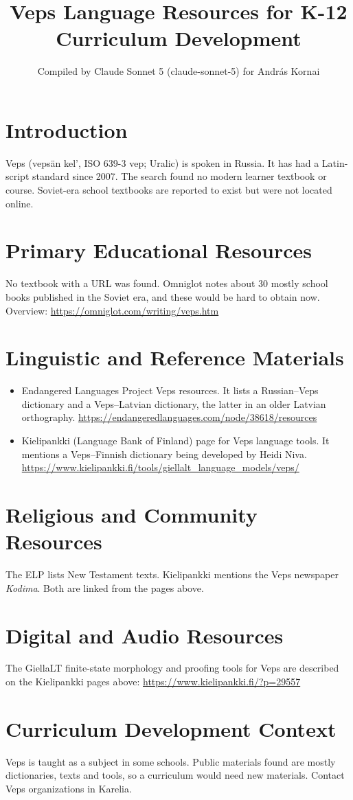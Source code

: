 \documentclass[12pt]{article}
\title{Veps Language Resources for K-12 Curriculum Development}
\author{Compiled by Claude Sonnet 5 (claude-sonnet-5) for Andr\'as Kornai}
\date{}
\begin{document}
\maketitle

\section{Introduction}
Veps (vepsän kel', ISO 639-3 vep; Uralic) is spoken in Russia. It has had a Latin-script standard since 2007. The search found no modern learner textbook or course. Soviet-era school textbooks are reported to exist but were not located online.

\section{Primary Educational Resources}
No textbook with a URL was found. Omniglot notes about 30 mostly school books published in the Soviet era, and these would be hard to obtain now. Overview: \url{https://omniglot.com/writing/veps.htm}

\section{Linguistic and Reference Materials}
\begin{itemize}
\item Endangered Languages Project Veps resources. It lists a Russian--Veps dictionary and a Veps--Latvian dictionary, the latter in an older Latvian orthography. \url{https://endangeredlanguages.com/node/38618/resources}
\item Kielipankki (Language Bank of Finland) page for Veps language tools. It mentions a Veps--Finnish dictionary being developed by Heidi Niva. \url{https://www.kielipankki.fi/tools/giellalt_language_models/veps/}
\end{itemize}

\section{Religious and Community Resources}
The ELP lists New Testament texts. Kielipankki mentions the Veps newspaper \emph{Kodima}. Both are linked from the pages above.

\section{Digital and Audio Resources}
The GiellaLT finite-state morphology and proofing tools for Veps are described on the Kielipankki pages above: \url{https://www.kielipankki.fi/?p=29557}

\section{Curriculum Development Context}
Veps is taught as a subject in some schools. Public materials found are mostly dictionaries, texts and tools, so a curriculum would need new materials. Contact Veps organizations in Karelia.
\end{document}
